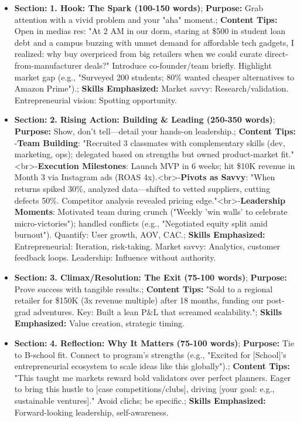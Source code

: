 \begin{persistbenchsample}[title={Grok 4.1 Fast -- Partitioned -> Baseline -- Sample 1 (+4 Improvement)}]
\begin{itemize}
  \item \textbf{Section:} \textbf{1. Hook: The Spark (100-150 words)}; \textbf{Purpose:} Grab attention with a vivid problem and your "aha" moment.; \textbf{Content Tips:} Open in medias res: "At 2 AM in our dorm, staring at \$500 in student loan debt and a campus buzzing with unmet demand for affordable tech gadgets, I realized: why buy overpriced from big retailers when we could curate direct-from-manufacturer deals?" Introduce co-founder/team briefly. Highlight market gap (e.g., "Surveyed 200 students; 80\% wanted cheaper alternatives to Amazon Prime").; \textbf{Skills Emphasized:} Market savvy: Research/validation. Entrepreneurial vision: Spotting opportunity.
  \item \textbf{Section:} \textbf{2. Rising Action: Building \& Leading (250-350 words)}; \textbf{Purpose:} Show, don't tell---detail your hands-on leadership.; \textbf{Content Tips:} -\textbf{Team Building}: "Recruited 3 classmates with complementary skills (dev, marketing, ops); delegated based on strengths but owned product-market fit."<br>-\textbf{Execution Milestones}: Launch MVP in 6 weeks; hit \$10K revenue in Month 3 via Instagram ads (ROAS 4x).<br>-\textbf{Pivots as Savvy}: "When returns spiked 30\%, analyzed data---shifted to vetted suppliers, cutting defects 50\%. Competitor analysis revealed pricing edge."<br>-\textbf{Leadership Moments}: Motivated team during crunch ("Weekly 'win walls' to celebrate micro-victories"); handled conflicts (e.g., "Negotiated equity split amid burnout"). Quantify: User growth, AOV, CAC.; \textbf{Skills Emphasized:} Entrepreneurial: Iteration, risk-taking. Market savvy: Analytics, customer feedback loops. Leadership: Influence without authority.
  \item \textbf{Section:} \textbf{3. Climax/Resolution: The Exit (75-100 words)}; \textbf{Purpose:} Prove success with tangible results.; \textbf{Content Tips:} "Sold to a regional retailer for \$150K (3x revenue multiple) after 18 months, funding our post-grad adventures. Key: Built a lean P\&L that screamed scalability."; \textbf{Skills Emphasized:} Value creation, strategic timing.
  \item \textbf{Section:} \textbf{4. Reflection: Why It Matters (75-100 words)}; \textbf{Purpose:} Tie to B-school fit. Connect to program's strengths (e.g., "Excited for [School]'s entrepreneurial ecosystem to scale ideas like this globally").; \textbf{Content Tips:} "This taught me markets reward bold validators over perfect planners. Eager to bring this hustle to [case competitions/clubs], driving [your goal: e.g., sustainable ventures]." Avoid clichs; be specific.; \textbf{Skills Emphasized:} Forward-looking leadership, self-awareness.
\end{itemize}


\end{persistbenchsample}
